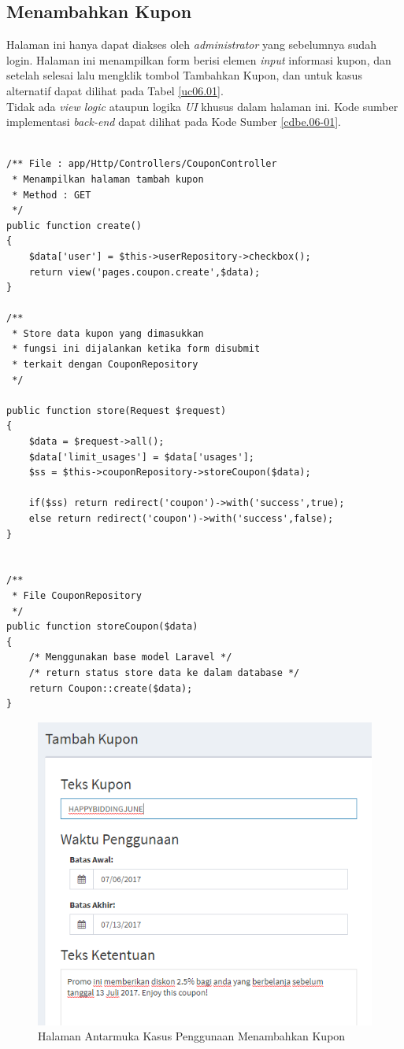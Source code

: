 \subsection{Menambahkan Kupon}
Halaman ini hanya dapat diakses oleh \textit{administrator} yang sebelumnya sudah login. Halaman ini menampilkan form berisi elemen \textit{input} informasi kupon, dan setelah selesai lalu mengklik tombol Tambahkan Kupon, dan untuk kasus alternatif dapat dilihat pada Tabel \ref{uc06.01}.\\
\indent Tidak ada \textit{view logic} ataupun logika \textit{UI} khusus dalam halaman ini. Kode sumber implementasi \textit{back-end} dapat dilihat pada Kode Sumber \ref{cdbe.06-01}.

\begin{lstlisting}[label=cdbe.06-01,style=php,caption=Kode Sumber Antarmuka Menambahkan Kupon]

/** File : app/Http/Controllers/CouponController
 * Menampilkan halaman tambah kupon
 * Method : GET
 */
public function create()
{
    $data['user'] = $this->userRepository->checkbox();
    return view('pages.coupon.create',$data);
}

/**
 * Store data kupon yang dimasukkan
 * fungsi ini dijalankan ketika form disubmit
 * terkait dengan CouponRepository
 */

public function store(Request $request)
{
    $data = $request->all();
    $data['limit_usages'] = $data['usages'];
    $ss = $this->couponRepository->storeCoupon($data);

    if($ss) return redirect('coupon')->with('success',true);
    else return redirect('coupon')->with('success',false);
}


/**
 * File CouponRepository
 */
public function storeCoupon($data)
{
	/* Menggunakan base model Laravel */
	/* return status store data ke dalam database */
    return Coupon::create($data);
}  
\end{lstlisting}
	  
      \begin{figure}[H]
        \centering
        \includegraphics[width=\textwidth]{images/bab4/ui/06-01.png}
        \caption{Halaman Antarmuka Kasus Penggunaan Menambahkan Kupon}
        \label{ui.01-01}
      \end{figure}
      
